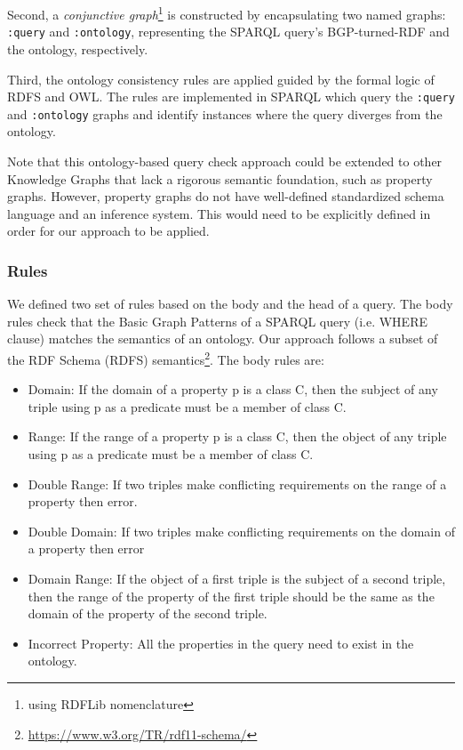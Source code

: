 \documentclass[11pt]{article}
\begin{document}
Second, a \textit{conjunctive graph}\footnote{using RDFLib nomenclature} is constructed by encapsulating two named graphs: \texttt{:query} and \texttt{:ontology}, representing the SPARQL query's BGP-turned-RDF and the ontology, respectively.

Third, the ontology consistency rules are applied guided by the formal logic of RDFS and OWL. The rules are implemented in SPARQL which query the \texttt{:query} and \texttt{:ontology} graphs and identify instances where the query diverges from the ontology.

Note that this ontology-based query check approach could be extended to other Knowledge Graphs that lack a rigorous semantic foundation, such as property graphs. 
However, property graphs do not have well-defined standardized schema language and an inference system. 
This would need to be explicitly defined in order for our approach to be applied.



\subsubsection{Rules}
We defined two set of rules based on the body and the head of a query. 
The body rules check that the Basic Graph Patterns of a SPARQL query (i.e. WHERE clause) matches the semantics of an ontology. 
Our approach follows a subset of the RDF Schema (RDFS) semantics\footnote{\url{https://www.w3.org/TR/rdf11-schema/}}. 
The body rules are: 
\begin{itemize}
    \item Domain: If the domain of a property p is a class C, then the subject of any triple using p as a predicate must be a member of class C.
    \item Range: If the range of a property p is a class C, then the object of any triple using p as a predicate must be a member of class C.
    \item Double Range: If two triples make conflicting requirements on the range of a property then error. 
    \item Double Domain: If two triples make conflicting requirements on the domain of a property then error
    \item Domain Range: If the object of a first triple is the subject of a second triple, then the range of the property of the first triple should be the same as the domain of the property of the second triple.
    \item Incorrect Property: All the properties in the query need to exist in the ontology. 

\end{itemize}
\end{document}
